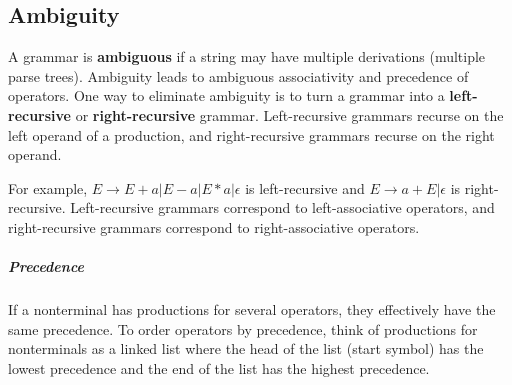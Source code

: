 \documentclass[11pt]{article}
\begin{document}
		\begin{center}
		\end{center}
	
	\subsection{Ambiguity}
		A grammar is \textbf{ambiguous} if a string may have multiple derivations (multiple parse trees). Ambiguity leads to ambiguous associativity and precedence of operators. One way to eliminate ambiguity is to turn a grammar into a \textbf{left-recursive} or \textbf{right-recursive} grammar. Left-recursive grammars recurse on the left operand of a production, and right-recursive grammars recurse on the right operand.
		
		For example, $E \rightarrow E + a | E - a | E * a | \epsilon$ is left-recursive and $E \rightarrow a + E | \epsilon$ is right-recursive. Left-recursive grammars correspond to left-associative operators, and right-recursive grammars correspond to right-associative operators.
		
		\subparagraph{Precedence} If a nonterminal has productions for several operators, they effectively have the same precedence. To order operators by precedence, think of productions for nonterminals as a linked list where the head of the list (start symbol) has the lowest precedence and the end of the list has the highest precedence.

\end{document}
